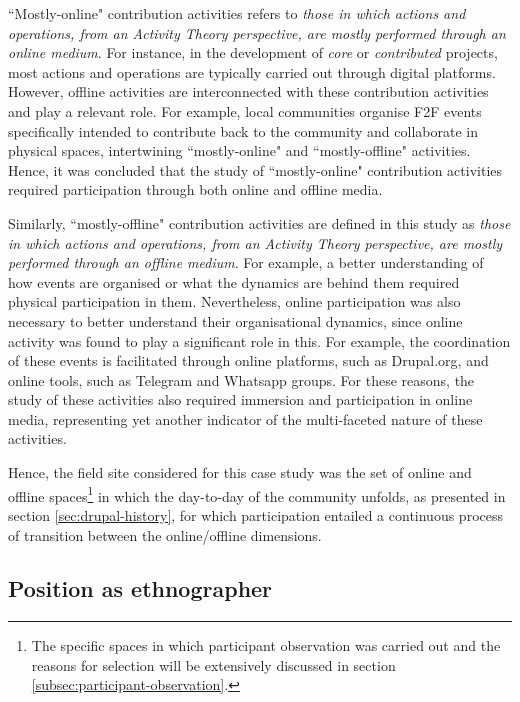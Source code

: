``Mostly-online" contribution activities refers to \textsl{those in which actions and operations, from an Activity Theory perspective, are mostly performed through an online medium}. For instance, in the development of \textit{core} or \textit{contributed} projects, most actions and operations are typically carried out through digital platforms. However, offline activities are interconnected with these contribution activities and play a relevant role. For example, local communities organise F2F events specifically intended to contribute back to the community and collaborate in physical spaces, intertwining ``mostly-online" and ``mostly-offline" activities. Hence, it was concluded that the study of ``mostly-online" contribution activities required participation through both online and offline media.

Similarly, ``mostly-offline" contribution activities are defined in this study as \textsl{those in which actions and operations, from an Activity Theory perspective, are mostly performed through an offline medium}. For example, a better understanding of how events are organised or what the dynamics are behind them required physical participation in them. Nevertheless, online participation was also necessary to better understand their organisational dynamics, since online activity was found to play a significant role in this. For example, the coordination of these events is facilitated through online platforms, such as Drupal.org, and online tools, such as Telegram and Whatsapp groups. For these reasons, the study of these activities also required immersion and participation in online media, representing yet another indicator of the multi-faceted nature of these activities.

Hence, the field site considered for this case study was the set of online and offline spaces\footnote{The specific spaces in which participant observation was carried out and the reasons for selection will be extensively discussed in section \ref{subsec:participant-observation}.} in which the day-to-day of the community unfolds, as presented in section \ref{sec:drupal-history}, for which participation entailed a continuous process of transition between the online/offline dimensions.

\subsection{Position as ethnographer}
\label{subsec:ethnographic-position}

